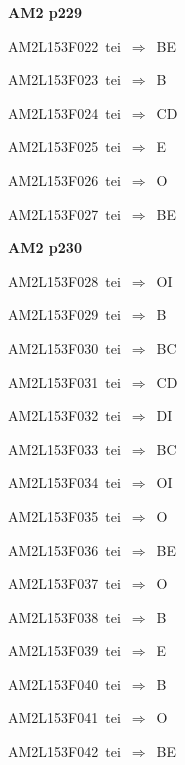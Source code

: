 \par\vfill\eject
{\bf\hfill AM2 p229\hfill\hbox{}}\par\bigskip
{\sixrm AM2L153F022\ {\sixit tei}\ }$\Rightarrow$\ BE\par\smallskip
{\sixrm AM2L153F023\ {\sixit tei}\ }$\Rightarrow$\ B\par\smallskip
{\sixrm AM2L153F024\ {\sixit tei}\ }$\Rightarrow$\ CD\par\smallskip
{\sixrm AM2L153F025\ {\sixit tei}\ }$\Rightarrow$\ E\par\smallskip
{\sixrm AM2L153F026\ {\sixit tei}\ }$\Rightarrow$\ {\tenit O}\par\smallskip
{\sixrm AM2L153F027\ {\sixit tei}\ }$\Rightarrow$\ BE\par\smallskip

\par\vfill\eject
{\bf\hfill AM2 p230\hfill\hbox{}}\par\bigskip
{\sixrm AM2L153F028\ {\sixit tei}\ }$\Rightarrow$\ OI\par\smallskip
{\sixrm AM2L153F029\ {\sixit tei}\ }$\Rightarrow$\ {\tenit B}\par\smallskip
{\sixrm AM2L153F030\ {\sixit tei}\ }$\Rightarrow$\ BC\par\smallskip
{\sixrm AM2L153F031\ {\sixit tei}\ }$\Rightarrow$\ CD\par\smallskip
{\sixrm AM2L153F032\ {\sixit tei}\ }$\Rightarrow$\ DI\par\smallskip
{\sixrm AM2L153F033\ {\sixit tei}\ }$\Rightarrow$\ BC\par\smallskip
{\sixrm AM2L153F034\ {\sixit tei}\ }$\Rightarrow$\ OI\par\smallskip
{\sixrm AM2L153F035\ {\sixit tei}\ }$\Rightarrow$\ {\tenit O}\par\smallskip
{\sixrm AM2L153F036\ {\sixit tei}\ }$\Rightarrow$\ BE\par\smallskip
{\sixrm AM2L153F037\ {\sixit tei}\ }$\Rightarrow$\ O\par\smallskip
{\sixrm AM2L153F038\ {\sixit tei}\ }$\Rightarrow$\ B\par\smallskip
{\sixrm AM2L153F039\ {\sixit tei}\ }$\Rightarrow$\ E\par\smallskip
{\sixrm AM2L153F040\ {\sixit tei}\ }$\Rightarrow$\ B\par\smallskip
{\sixrm AM2L153F041\ {\sixit tei}\ }$\Rightarrow$\ O\par\smallskip
{\sixrm AM2L153F042\ {\sixit tei}\ }$\Rightarrow$\ BE\par\smallskip
